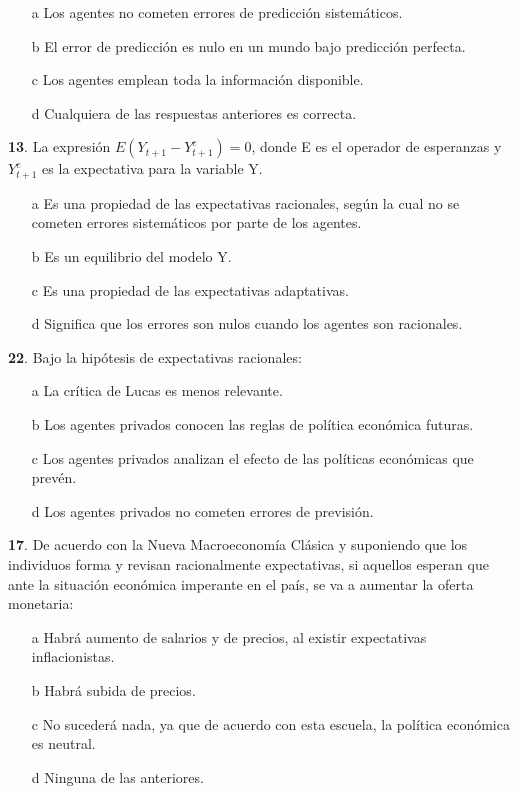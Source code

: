 \documentclass{nuevotema}
\begin{document}
\begin{enumerate}
	\item[a] Los agentes no cometen errores de predicción sistemáticos.
	\item[b] El error de predicción es nulo en un mundo bajo predicción perfecta.
	\item[c] Los agentes emplean toda la información disponible.
	\item[d] Cualquiera de las respuestas anteriores es correcta.
\end{enumerate}


\textbf{13}. La expresión $E(Y_{t+1} - Y^e_{t+1}) = 0$, donde E es el operador de esperanzas y $Y^e_{t+1}$ es la expectativa para la variable Y.

\begin{enumerate}
	\item[a] Es una propiedad de las expectativas racionales, según la cual no se cometen errores sistemáticos por parte de los agentes.
	\item[b] Es un equilibrio del modelo Y.
	\item[c] Es una propiedad de las expectativas adaptativas.
	\item[d] Significa que los errores son nulos cuando los agentes son racionales.
\end{enumerate}


\textbf{22}. Bajo la hipótesis de expectativas racionales:

\begin{enumerate}
\item[a] La crítica de Lucas es menos relevante.
\item[b] Los agentes privados conocen las reglas de política económica futuras.
\item[c] Los agentes privados analizan el efecto de las políticas económicas que prevén.
\item[d] Los agentes privados no cometen errores de previsión.
\end{enumerate}


\textbf{17}. De acuerdo con la Nueva Macroeconomía Clásica y suponiendo que los individuos forma y revisan racionalmente expectativas, si aquellos esperan que ante la situación económica imperante en el país, se va a aumentar la oferta monetaria:

\begin{enumerate}
	\item[a] Habrá aumento de salarios y de precios, al existir expectativas inflacionistas.
	\item[b] Habrá subida de precios.
	\item[c] No sucederá nada, ya que de acuerdo con esta escuela, la política económica es neutral.
	\item[d] Ninguna de las anteriores.
\end{enumerate}
\end{document}
